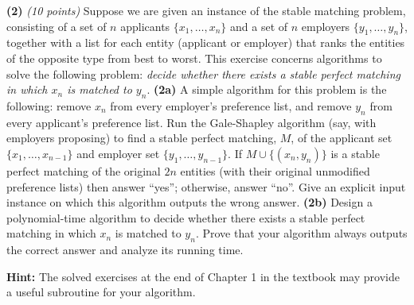 \documentclass[12pt]{article}
\def\gap{0.1in}
\def\bigap{0.25in}
\begin{document}
\setlength{\parindent}{0in}
\addtolength{\parskip}{0.1cm}
\setlength{\fboxrule}{.5mm}\setlength{\fboxsep}{1.2mm}
\newlength{\boxlength}\setlength{\boxlength}{\textwidth}
\addtolength{\boxlength}{-4mm}
\begin{center}
\end{center}
\vspace{5mm}

{\bf (2)} {\em (10 points)}
  Suppose we are given an instance of the stable matching
  problem, consisting of a set of $n$ applicants
  $\{x_1,\ldots,x_n\}$ and a set of $n$ employers
  $\{y_1,\ldots,y_n\}$, together with a list for
  each entity (applicant or employer) that ranks the
  entities of the opposite type from best to worst.
  This exercise concerns algorithms to solve the following
  problem: {\em decide whether there exists a stable perfect
  matching in which $x_n$ is matched to $y_n$}.
  \vskip \gap
{\bf (2a)}
  A simple algorithm for this problem is the following:
  remove $x_n$ from every employer's preference list,
  and remove $y_n$ from every applicant's preference list.
  Run the Gale-Shapley algorithm (say, with employers proposing)
  to find a stable
  perfect matching, $M$, of the applicant set
  $\{x_1,\ldots,x_{n-1}\}$ and employer set
  $\{y_1,\ldots,y_{n-1}\}$.
  If $M \cup \{(x_n,y_n)\}$ is a stable perfect matching
  of the original $2n$ entities
  (with their original unmodified preference
  lists) then answer ``yes''; otherwise, answer ``no''.
  Give an explicit input instance on which this
  algorithm outputs the wrong answer.
  \vskip \gap
{\bf (2b)}
  Design a polynomial-time algorithm to decide
  whether there exists a stable perfect
  matching in which $x_n$ is matched to $y_n$.
  Prove that your algorithm always outputs
  the correct answer and analyze its running
  time.

  {\bf Hint:} The solved exercises at the end
  of Chapter 1 in the textbook may provide a
  useful subroutine for your algorithm.

\vskip \bigap

\end{document}
